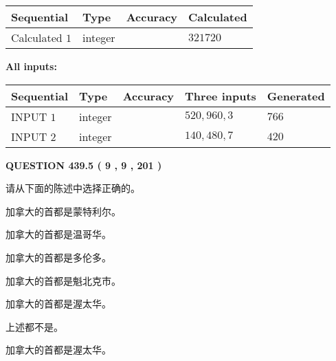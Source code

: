 \documentclass{ctexart}
\begin{document}
   
  
  
\noindent\begin{tabular}{|l|l|l|l|}
\hline
 Sequential & Type & Accuracy & Calculated \\ 
\hline
 
 
  Calculated $  1 $ & integer &  & 
  $ 321720 $ 
 \\  \hline  
 \end{tabular}
   
   
   
   
\noindent\vspace{0.1in}\hspace{-0.08in} {\textbf{\Large{All inputs: }}}
   
   
  
  
\noindent\begin{tabular}{|l|l|l|l|l|}
\hline
 Sequential & Type & Accuracy & Three inputs & Generated \\ 
\hline
 
 
  INPUT $  1 $ & integer &  & $
 520
 , 
 960
 , 
 3
 $ & $ 766 $ 
 \\  \hline  
 
 
  INPUT $  2 $ & integer &  & $
 140
 , 
 480
 , 
 7
 $ & $ 420 $ 
 \\  \hline  
 \end{tabular}
   
   
  
\vspace{0.2in}
  
{\textbf{\Large{QUESTION
439.5 
 ( 9 , 9 , 201 )
}}}
  
  
请从下面的陈述中选择正确的。
 
 
加拿大的首都是蒙特利尔。
 
 
加拿大的首都是温哥华。
 
 
加拿大的首都是多伦多。
 
 
加拿大的首都是魁北克市。
 
 
加拿大的首都是渥太华。
 
 
 上述都不是。
 
 
\noindent{}
 
 
加拿大的首都是渥太华。
 
 
\noindent{}
 
\end{document}
